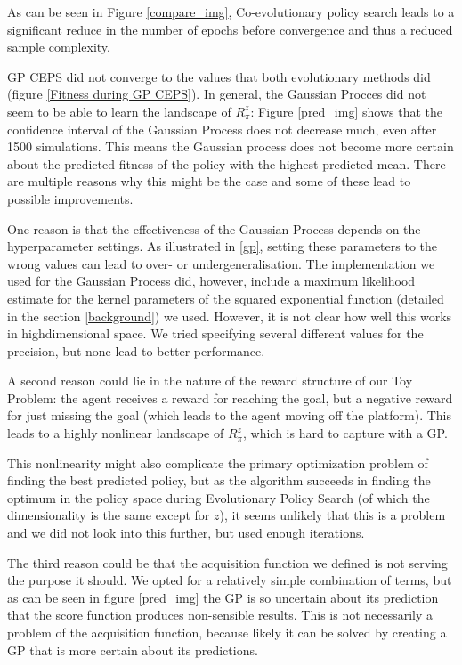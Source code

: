 
As can be seen in Figure \ref{compare_img}, Co-evolutionary policy search leads to a significant reduce in the number of epochs before convergence and thus a reduced sample complexity. 

GP CEPS did not converge to the values that both evolutionary methods did (figure \ref{Fitness during GP CEPS}). In general, the Gaussian Procces did not seem to be able to learn the landscape of $R_{\pi}^z$: Figure \ref{pred_img} shows that the confidence interval of the Gaussian Process does not decrease much, even after 1500 simulations. This means the Gaussian process does not become more certain about the predicted fitness of the policy with the highest predicted mean.
There are multiple reasons why this might be the case and some of these lead to possible improvements. 

One reason is that the effectiveness of the Gaussian Process depends on the hyperparameter settings. As illustrated in \ref{gp}, setting these parameters to the wrong values can lead to over- or undergeneralisation. The implementation we used for the Gaussian Process did, however, include a maximum likelihood estimate for the kernel parameters of the squared exponential function (detailed in the section \ref{background}) we used. However, it is not clear how well this works in highdimensional space. We tried specifying several different values for the precision, but none lead to better performance. 

A second reason could lie in the nature of the reward structure of our Toy Problem: the agent receives a reward for reaching the goal, but a negative reward for just missing the goal (which leads to the agent moving off the platform). This leads to a highly nonlinear landscape of $R_{\pi}^z$, which is hard to capture with a GP. 

This nonlinearity might also complicate the primary optimization problem of finding the best predicted policy, but as the algorithm succeeds in finding the optimum in the policy space during Evolutionary Policy Search (of which the dimensionality is the same except for $z$), it seems unlikely that this is a problem and we did not look into this further, but used enough iterations.

The third reason could be that the acquisition function we defined is not serving the purpose it should. We opted for a relatively simple combination of terms, but as can be seen in figure \ref{pred_img} the GP is so uncertain about its prediction that the score function produces non-sensible results. This is not necessarily a problem of the acquisition function, because likely it can be solved by creating a GP that is more certain about its predictions.

